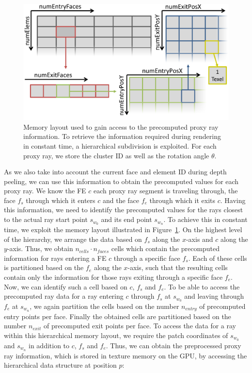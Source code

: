 \documentclass[journal]{vgtc}                %
\begin{document}
\begin{figure}[t]
    \centering
    \includegraphics[width=\linewidth]{figures/curvetexmap-memorylayout}
    \caption{Memory layout used to gain access to the precomputed proxy ray information. To retrieve the information required during rendering in constant time, a hierarchical subdivision is exploited. For each proxy ray, we store the cluster ID as well as the rotation angle $\theta$.}
    \label{fig:memorylayout}
\end{figure}

As we also take into account the current face and element ID during depth peeling, we can use this information to obtain the precomputed values for each proxy ray. We know the FE $c$ each proxy ray segment is traveling through, the face $f_s$ through which it enters $c$ and the face $f_e$ through which it exits $c$. Having this information, we need to identify the precomputed values for the rays closest to the actual ray start point $s_{w_0}$ and its end point $s_{w_n}$. To achieve this in constant time, we exploit the memory layout illustrated in Figure~\ref{fig:memorylayout}. On the highest level of the hierarchy, we arrange the data based on $f_s$ along the $x$-axis and $c$ along the $y$-axis. Thus, we obtain $n_{cells} \cdot n_{faces}$ cells which contain the precomputed information for rays entering a FE $c$ through a specific face $f_s$. Each of these cells is partitioned based on the $f_e$ along the $x$-axis, such that the resulting cells contain only the information for those rays exiting through a specific face $f_e$. Now, we can identify such a cell based on $c$, $f_s$ and $f_e$. To be able to access the precomputed ray data for a ray entering $c$ through $f_s$ at $s_{w_0}$ and leaving through $f_e$ at $s_{w_n}$, we again partition the cells based on the number $n_{entry}$ of precomputed entry points per face. Finally the obtained cells are partitioned based on the number $n_{exit}$ of precomputed exit points per face. To access the data for a ray within this hierarchical memory layout, we require the patch coordinates of $s_{w_0}$ and $s_{w_n}$ in addition to $c$, $f_s$ and $f_e$. Thus, we can obtain the preprocessed proxy ray information, which is stored in texture memory on the GPU, by accessing the hierarchical data structure at position $p$:
\end{document}
